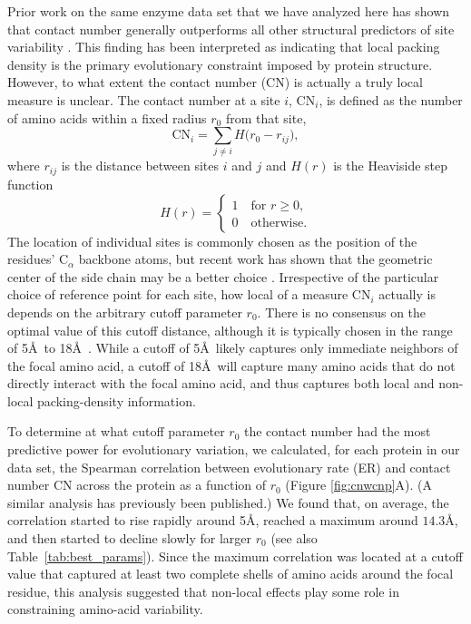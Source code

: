 \documentclass[12pt]{article}
\begin{document}
Prior work on the same enzyme data set that we have analyzed here has shown that contact number generally outperforms all other structural predictors of site variability \cite{yeh_site-specific_2014, yeh_local_2014, huang_mechanistic_2014}. This finding has been interpreted as indicating that local packing density is the primary evolutionary constraint imposed by protein structure. However, to what extent the contact number (CN) is actually a truly local measure is unclear. The contact number at a site $i$, CN$_i$, is defined as the number of amino acids within a fixed radius $r_0$ from that site,
    \begin{equation}
        \label{eqn:cn}
        \text{CN}_{i} = \sum_{j\neq i} H\big(r_0-r_{ij}\big),
    \end{equation}
where $r_{ij}$ is the distance between sites $i$ and $j$ and $H(r)$ is the Heaviside step function
    \begin{equation}
        \label{eqn:heaviside}
        H(r) = \begin{cases}
        			1 \quad\text{for $r\geq 0$,}\\
                    0 \quad\text{otherwise.}
               \end{cases}
    \end{equation}
The location of individual sites is commonly chosen as the position of the residues' C$_\alpha$ backbone atoms, but recent work has shown that the geometric center of the side chain may be a better choice \cite{marcos_too_2015}. Irrespective of the particular choice of reference point for each site, how local of a measure CN$_i$ actually is depends on the arbitrary cutoff parameter $r_0$. There is no consensus on the optimal value of this cutoff distance, although it is typically chosen in the range of 5\AA\ to 18\AA\ \cite{lin_deriving_2008, franzosa_structural_2009, weng_molecular_2014, yeh_local_2014}. While a cutoff of 5\AA\ likely captures only immediate neighbors of the focal amino acid, a cutoff of 18\AA\ will capture many amino acids that do not directly interact with the focal amino acid, and thus captures both local and non-local packing-density information.

To determine at what cutoff parameter $r_0$ the contact number had the most predictive power for evolutionary variation, we calculated, for each protein in our data set, the Spearman correlation between evolutionary rate (ER) and contact number CN across the protein as a function of $r_0$ (Figure \ref{fig:cnwcnp}A). (A similar analysis has previously been published\cite{yeh_local_2014}.) We found that, on average, the correlation started to rise rapidly around 5\AA, reached a maximum around $14.3$\AA, and then started to decline slowly for larger $r_0$ (see also Table~\ref{tab:best_params}). Since the maximum correlation was located at a cutoff value that captured at least two complete shells of amino acids around the focal residue, this analysis suggested that non-local effects play some role in constraining amino-acid variability.
\end{document}
